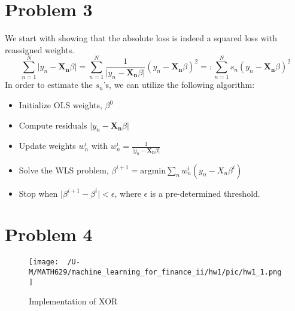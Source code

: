 \documentclass{article}
\begin{document}
\section*{Problem 3}
We start with showing that the absolute loss is indeed a squared loss with reassigned weights.
\begin{equation}
    \sum_{n = 1}^N \vert y_n - \mathbf{X_n}\beta \vert = \sum_{n = 1}^N \frac{1}{ \vert y_n - \mathbf{X_n}\beta \vert}
    (y_n - \mathbf{X_n}\beta)^2 =: \sum_{n = 1}^N s_n(y_n - \mathbf{X_n}\beta)^2
\end{equation}
In order to estimate the $s_n$'s, we can utilize the following algorithm:
\begin{itemize}
    \item Initialize OLS weights, $\beta^0$
    \item Compute residuals $\vert y_n - \mathbf{X_n}\beta \vert$
    \item Update weights $w^i_n$ with $w^i_n = \frac{1}{\vert y_n - \mathbf{X_n}\beta \vert}$
    \item Solve the WLS problem, $\beta^{i+1} = \mathrm{argmin}\sum_n w^i_n(y_n - X_n\beta^i)$
    \item Stop when $\vert \beta^{i+1} - \beta^i \vert < \epsilon$, where $\epsilon$ is a pre-determined threshold.
\end{itemize}

\section*{Problem 4}
\begin{figure}[H]
    \centering
    \caption{Implementation of XOR}
    \texttt{[image: ~/U-M/MATH629/machine\_learning\_for\_finance\_ii/hw1/pic/hw1\_1.png]}
\end{figure}
\end{document}
